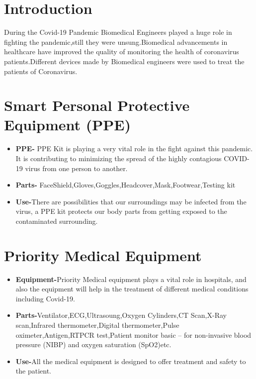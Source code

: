 \documentclass[12pt]{article}
\begin{document}
\section*{Introduction}

During the Covid-19 Pandemic Biomedical Engineers played a huge role in fighting the pandemic,still they were unsung.Biomedical advancements in healthcare have  improved the quality of monitoring the health of coronavirus patients.Different devices made by Biomedical engineers were used to treat the patients of Coronavirus.

\section{Smart Personal Protective Equipment (PPE)}

\begin{itemize}
\item \textbf{PPE-} PPE Kit is playing a very vital role in the fight against this pandemic. It is contributing to minimizing the spread of the highly contagious COVID-19 virus from one person to another.
\item\textbf{Parts-} FaceShield,Gloves,Goggles,Headcover,Mask,Footwear,Testing kit
\item \textbf{Use-}There are possibilities that our surroundings may be infected from the virus, a PPE kit protects our body parts from getting exposed to the contaminated surrounding.


\end{itemize}




\section{Priority Medical Equipment}

\begin{itemize}
\item \textbf{Equipment-}Priority Medical equipment plays a vital role in hospitals, and also the equipment will help in the treatment of different medical conditions including Covid-19.
\item \textbf{Parts-}Ventilator,ECG,Ultrasoung,Oxygen Cylinders,CT Scan,X-Ray scan,Infrared thermometer,Digital thermometer,Pulse oximeter,Antigen,RTPCR test,Patient monitor basic – for
non-invasive blood pressure (NIBP) and oxygen
saturation (SpO2)etc.
\item \textbf{Use-}All the medical equipment is designed to offer treatment and safety to the patient.

\end{itemize}
\end{document}
